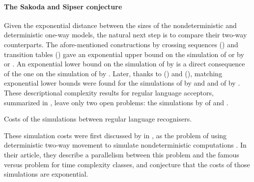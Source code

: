 \paragraph{The Sakoda and Sipser conjecture} Given the exponential distance between the sizes of the nondeterministic and deterministic one-way models, the natural next step is to compare their two-way counterparts.
The afore-mentioned constructions by crossing sequences (\cite{RabSco59}) and transition tables (\cite{She59}) gave an exponential upper bound on the simulation of \TNFA or \TDFA by \ONFA or \ODFA.
An exponential lower bound on the simulation of \TNFA by \ODFA is a direct consequence of the one on the simulation of \ONFA by \ODFA.
Later, thanks to \citeauthor{Bir93} (\citeyear{Bir93}) and \citeauthor{Kap05} (\citeyear{Kap05}), matching exponential lower bounds were found for the simulations of \TDFA by \ONFA and \ODFA and of \TNFA by \ONFA \cite{Bir93,Kap05}.
These descriptional complexity results for regular language acceptors, summarized in , leave only two open problems: the simulations by \TDFA of \TNFA and \ONFA.

\begin{table}
	\centering
	
	\caption{Costs of the simulations between regular language recognisers.}
	\label{tab:sims-core-general-context}
\end{table}

These simulation costs were first discussed by \citeauthor{SakSip78} in \citeyear{SakSip78}, as the problem of using deterministic two-way movement to simulate nondeterministic computations \cite{SakSip78}.
In their article, they describe a parallelism between this problem and the famous \cP versus \cNP problem for time complexity classes, and conjecture that the costs of those simulations are exponential.

